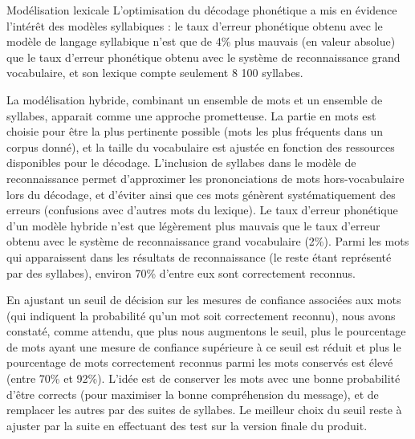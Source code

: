 \documentclass{style/these}
\begin{document}
\begin{part}{Modélisation lexicale}
L'optimisation du décodage phonétique a mis en évidence l'intérêt des modèles syllabiques : le taux d'erreur phonétique obtenu avec le modèle de langage syllabique n'est que de 4\% plus mauvais (en valeur absolue) que le taux d'erreur phonétique obtenu avec le système de reconnaissance grand vocabulaire, et son lexique compte seulement 8 100 syllabes.  

La modélisation hybride, combinant un ensemble de mots et un ensemble de syllabes, apparait comme une approche prometteuse. 
La partie en mots est choisie pour être la plus pertinente possible (mots les plus fréquents dans un corpus donné), et la taille du vocabulaire est ajustée en fonction des ressources disponibles pour le décodage. 
L'inclusion de syllabes dans le modèle de reconnaissance permet d'approximer les prononciations de mots hors-vocabulaire lors du décodage, et d'éviter ainsi que ces mots génèrent systématiquement des erreurs (confusions avec d'autres mots du lexique).
Le taux d'erreur phonétique d'un modèle hybride n'est que légèrement plus mauvais que le taux d'erreur obtenu avec le système de reconnaissance grand vocabulaire (2\%). 
Parmi les mots qui apparaissent dans les résultats de reconnaissance (le reste étant représenté par des syllabes), environ 70\% d'entre eux sont correctement reconnus. 

En ajustant un seuil de décision sur les mesures de confiance associées aux mots (qui indiquent la probabilité qu'un mot soit correctement reconnu), nous avons constaté, comme attendu, que plus nous augmentons le seuil, plus le pourcentage de mots ayant une mesure de confiance supérieure à ce seuil est réduit et plus le pourcentage de mots correctement reconnus parmi les mots conservés est élevé (entre 70\% et 92\%).
L'idée est de conserver les mots avec une bonne probabilité d'être corrects (pour maximiser la bonne compréhension du message), et de remplacer les autres par des suites de syllabes. 
Le meilleur choix du seuil reste à ajuster par la suite en effectuant des test sur la version finale du produit. 


\end{part}
\end{document}
